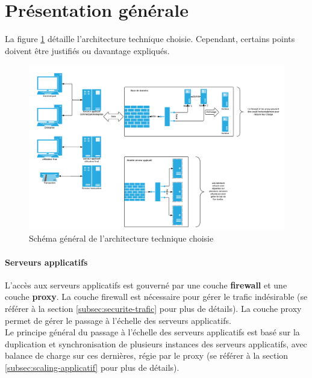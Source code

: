 




\section{Présentation générale}

La figure \ref{fig:network} détaille l'architecture technique choisie.
Cependant, certains points doivent être justifiés ou davantage expliqués.

\begin{landscape}
  \begin{figure}[htpb]
      \centering
      \includegraphics[width=0.7\paperheight]{network}
      \caption{Schéma général de l'architecture technique choisie}
      \label{fig:network}
  \end{figure}
\end{landscape}

\paragraph{Serveurs applicatifs}

L'accès aux serveurs applicatifs est gouverné par une couche \textbf{firewall}
et une couche \textbf{proxy}. La couche firewall est nécessaire pour gérer le
trafic indésirable (se référer à la section
\ref{subsec:securite-trafic} pour plus de détails). La couche proxy
permet de gérer le passage à l'échelle des serveurs applicatifs. \\

Le principe général du passage à l'échelle des serveurs applicatifs est basé
sur la duplication et synchronisation de plusieurs instances des serveurs
applicatifs, avec balance de charge sur ces dernières, régie par le proxy (se
référer à la section \ref{subsec:scaling-applicatif} pour plus de détails).

